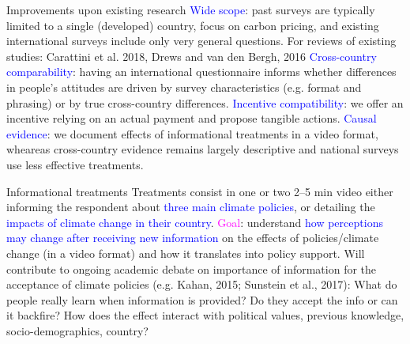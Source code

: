\begin{frame}{Improvements upon existing research}
\bbs
\ip \textcolor{blue}{Wide scope}: past surveys are typically limited to a single (developed) country, focus on carbon pricing,
and existing international surveys include only very general questions.
\bbs
\ip For reviews of existing studies: Carattini et al. 2018, Drews and van den Bergh, 2016
\ee 
\ip \textcolor{blue}{Cross-country comparability}: having an international questionnaire informs whether differences in people’s attitudes are driven by survey characteristics (e.g. format and phrasing) or by true cross-country differences.
\ip \textcolor{blue}{Incentive compatibility}: we offer an incentive relying on an actual payment and propose tangible actions.
\ip \textcolor{blue}{Causal evidence}: we document effects of informational treatments in a video format, wheareas cross-country evidence remains largely descriptive and national surveys use less effective treatments.
\ee
\end{frame}



\begin{frame}{Informational treatments}
\bbs
\ip Treatments consist in one or two 2--5 min video either informing the respondent about
\textcolor{blue}{three main climate policies}, or detailing the \textcolor{blue}{impacts of climate change in their country}.
\ip \textcolor{magenta}{Goal}: understand \textcolor{blue}{how perceptions may change after
receiving new information} on the effects of policies/climate change (in a video
format) and how it translates into policy support.
\ip Will contribute to ongoing academic debate on importance of information for the acceptance of climate policies (e.g. Kahan, 2015; Sunstein et al., 2017):
\bbvs
\ip What do people really learn when information is provided?
\ip Do they accept the info or can it backfire?
\ip How does the effect interact with political values, previous knowledge, socio-demographics, country?
\ee
\ee
\end{frame}

